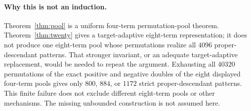 \documentclass[11pt]{article}
\begin{document}
\paragraph{Why this is not an induction.}
Theorem~\ref{thm:pool} is a uniform four-term permutation-pool theorem.
Theorem~\ref{thm:twenty} gives a target-adaptive eight-term representation;
it does not produce one eight-term pool whose permutations realize all
$4096$ proper-descendant patterns. That stronger invariant, or an
adequate target-adaptive replacement, would be needed to repeat the
argument. Exhausting all $40320$ permutations of the exact positive and
negative doubles of the eight displayed four-term pools gives only
$800$, $884$, or $1172$ strict proper-descendant patterns. This finite
failure does not exclude different eight-term pools or other mechanisms.
The missing unbounded construction is not assumed here.
\end{document}
